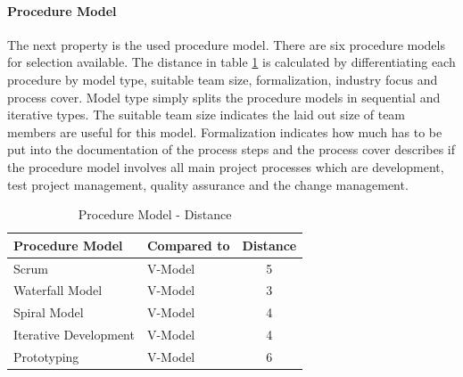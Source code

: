 \paragraph*{\textbf{Procedure Model}}
The next property is the used procedure model. There are six procedure models for selection available. The distance in table \ref{property:proceduremodel} is calculated by differentiating each procedure by model type, suitable team size, formalization, industry focus and process cover. Model type simply splits the procedure models in sequential and iterative types. The suitable team size indicates the laid out size of team members are useful for this model. Formalization indicates how much has to be put into the documentation of the process steps and the process cover describes if the procedure model involves all main project processes which are development, test project management, quality assurance and the change management.
\begin{table}[h]
	\centering 
	\setlength{\tabcolsep}{4pt}
	\begin{tabular}{|l|l|c|}\hline
		Procedure Model			& Compared to 	&  Distance 	\\ \hline
		Scrum   				& V-Model		& 5      		\\ \hline
		Waterfall Model   		& V-Model 		& 3      		\\ \hline
		Spiral Model   			& V-Model 		& 4     		\\ \hline
		Iterative Development   & V-Model 		& 4     		\\ \hline
		Prototyping  			& V-Model 		& 6     		\\ \hline
	\end{tabular} 
	\caption{Procedure Model - Distance} 
	\label{property:proceduremodel} 
\end{table}

